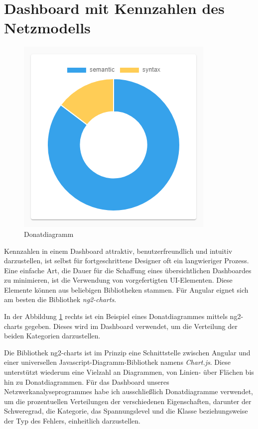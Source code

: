 \section{Dashboard mit Kennzahlen des Netzmodells}
\label{chp:dashboard}

\setcapindent{0pt}
\begin{figure}
  \begin{center}
    \includegraphics[width=0.8\linewidth]{content/img/Empire/Frontend/Dashboard_Donatdiagramm.png}
  \end{center}
  \caption{Donatdiagramm}
  \label{fig:einfachesDonatdiagramm}
\end{figure}
\setcapindent{83pt}

Kennzahlen in einem Dashboard attraktiv, benutzerfreundlich und intuitiv darzustellen, ist selbst für fortgeschrittene Designer oft ein langwieriger Prozess. Eine einfache Art, die Dauer für die Schaffung eines übersichtlichen Dashboardes zu minimieren, ist die Verwendung von vorgefertigten UI-Elementen. Diese Elemente können aus beliebigen Bibliotheken stammen. Für Angular eignet sich am besten die Bibliothek \emph{ng2-charts}.

In der Abbildung \ref{fig:einfachesDonatdiagramm} rechts ist ein Beispiel eines Donatdiagrammes mittels ng2-charts gegeben. Dieses wird im Dashboard verwendet, um die Verteilung der beiden Kategorien darzustellen.

Die Bibliothek ng2-charts ist im Prinzip eine Schnittstelle zwischen Angular und einer universellen Javascript-Diagramm-Bibliothek namens \emph{Chart.js}. Diese unterstützt wiederum eine Vielzahl an Diagrammen, von Linien- über Flächen bis hin zu Donatdiagrammen. Für das Dashboard unseres Netzwerkanalyseprogrammes habe ich ausschließlich Donatdiagramme verwendet, um die prozentuellen Verteilungen der verschiedenen Eigenschaften, darunter der Schweregrad, die Kategorie, das Spannungslevel und die Klasse beziehungsweise der Typ des Fehlers, einheitlich darzustellen. \cite{ng2-charts}

